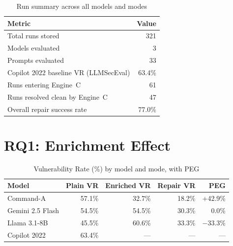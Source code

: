 \documentclass[12pt,a4paper]{report}
\begin{document}
\begin{table}[H]
\centering
\caption{Run summary across all models and modes}
\label{tab:runsummary}
\renewcommand{\arraystretch}{1.3}
\begin{tabular}{@{}lr@{}}
\toprule
\textbf{Metric}                        & \textbf{Value} \\
\midrule
Total runs stored                      & 321    \\
Models evaluated                       & 3      \\
Prompts evaluated                      & 33     \\
Copilot 2022 baseline VR (LLMSecEval) & 63.4\% \\
Runs entering Engine~C                 & 61     \\
Runs resolved clean by Engine~C        & 47     \\
Overall repair success rate            & 77.0\% \\
\bottomrule
\end{tabular}
\end{table}

\section{RQ1: Enrichment Effect}
\label{sec:rq1}

\begin{table}[H]
\centering
\caption{Vulnerability Rate (\%) by model and mode, with PEG}
\label{tab:vr}
\renewcommand{\arraystretch}{1.3}
\begin{tabular}{@{}lrrrr@{}}
\toprule
\textbf{Model} & \textbf{Plain VR} & \textbf{Enriched VR}
               & \textbf{Repair VR} & \textbf{PEG} \\
\midrule
Command-A         & 57.1\% & 32.7\% & 18.2\% & $+$42.9\% \\
Gemini 2.5 Flash  & 54.5\% & 54.5\% & 30.3\% & $\phantom{+}$0.0\% \\
Llama 3.1-8B      & 45.5\% & 60.6\% & 33.3\% & $-$33.3\%  \\
\midrule
Copilot 2022      & 63.4\% & ---    & ---    & ---       \\
\bottomrule
\end{tabular}
\end{table}
\end{document}
